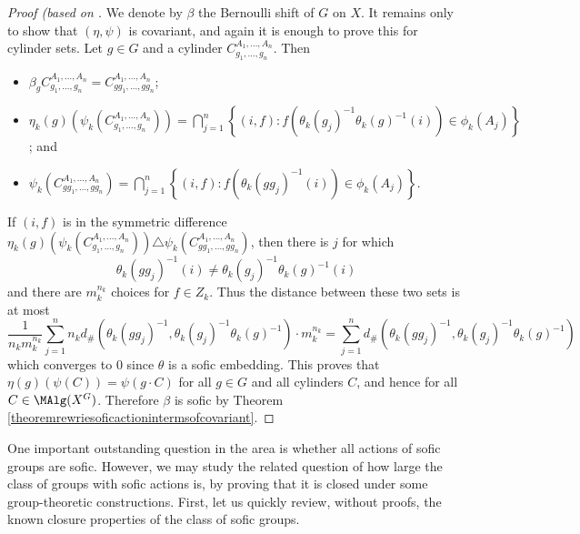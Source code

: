 \begin{proof}[Proof (based on \cite{ozawasoficnotes}]
We denote by $\beta$ the Bernoulli shift of $G$ on $X$. It remains only to show that $(\eta,\psi)$ is covariant, and again it is enough to prove this for cylinder sets. Let $g\in G$ and a cylinder $C_{g_1,\ldots,g_n}^{A_1,\ldots,A_n}$. Then
\begin{itemize}
\item $\displaystyle{\beta_gC_{g_1,\ldots,g_n}^{A_1,\ldots,A_n}=C_{gg_1,\ldots,gg_n}^{A_1,\ldots,A_n}}$;
\item $\displaystyle{\eta_k(g)(\psi_k(C_{g_1,\ldots,g_n}^{A_1,\ldots,A_n}))=\bigcap_{j=1}^n\left\{(i,f):f(\theta_k(g_j)^{-1}\theta_k(g)^{-1}(i))\in\phi_k(A_j)\right\}}$; and
\item $\displaystyle{\psi_k(C_{gg_1,\ldots,gg_n}^{A_1,\ldots,A_n})=\bigcap_{j=1}^n\left\{(i,f):f(\theta_k(gg_j)^{-1}(i))\in\phi_k(A_j)\right\}}$.
\end{itemize}
If $(i,f)$ is in the symmetric difference $\eta_k(g)(\psi_k(C_{g_1,\ldots,g_n}^{A_1,\ldots,A_n}))\triangle\psi_k(C_{gg_1,\ldots,gg_n}^{A_1,\ldots,A_n})$, then there is $j$ for which
\[\theta_k(gg_j)^{-1}(i)\neq\theta_k(g_j)^{-1}\theta_k(g)^{-1}(i)\]
and there are $m_k^{n_k}$ choices for $f\in Z_k$. Thus the distance between these two sets is at most
\[\frac{1}{n_k m_k^{n_k}}\sum_{j=1}^nn_kd_\#(\theta_k(gg_j)^{-1},\theta_k(g_j)^{-1}\theta_k(g)^{-1})\cdot m_k^{n_k}=\sum_{j=1}^nd_\#(\theta_k(gg_j)^{-1},\theta_k(g_j)^{-1}\theta_k(g)^{-1})\]
which converges to $0$ since $\theta$ is a sofic embedding. This proves that $\eta(g)(\psi(C))=\psi(g\cdot C)$ for all $g\in G$ and all cylinders $C$, and hence for all $C\in\MAlg(X^G)$. Therefore $\beta$ is sofic by Theorem \ref{theoremrewriesoficactionintermsofcovariant}.\qedhere
\end{proof}


One important outstanding question in the area is whether all actions of sofic groups are sofic. However, we may study the related question of how large the class of groups with sofic actions is, by proving that it is closed under some group-theoretic constructions. First, let us quickly review, without proofs, the known closure properties of the class of sofic groups.


